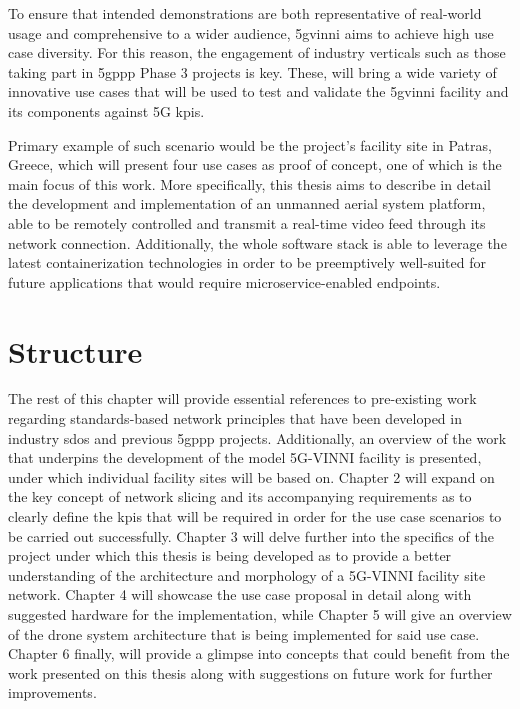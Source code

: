 To ensure that intended demonstrations are both representative of real-world usage and comprehensive to a wider audience, \acrshort{5gvinni} aims to achieve high use case diversity. For this reason, the engagement of industry verticals such as those taking part in \acrshort{5gppp} Phase 3 projects is key. These,  will bring a wide variety of innovative use cases that will be used to test and validate the \acrshort{5gvinni} facility and its components against 5G \acrshort{kpi}s. 

Primary example of such scenario would be the project's facility site in Patras, Greece, which will present four use cases as proof of concept, one of which is the main focus of this work. More specifically, this thesis aims to describe in detail the development and implementation of an unmanned aerial system platform, able to be remotely controlled and transmit a real-time video feed through its network connection. Additionally, the whole software stack is able to leverage the latest containerization technologies in order to be preemptively well-suited for future applications that would require microservice-enabled endpoints.

\section{Structure}
The rest of this chapter will provide essential references to pre-existing work regarding standards-based network principles that have been developed in industry \acrfull{sdo}s and previous \acrshort{5gppp} projects. Additionally, an overview of the work that underpins the development of the model 5G-VINNI facility is presented, under which individual facility sites will be based on.
Chapter 2 will expand on the key concept of network slicing and its accompanying requirements as to clearly define the \acrshort{kpi}s that will be required in order for the use case scenarios to be carried out successfully.
Chapter 3 will delve further into the specifics of the project under which this thesis is being developed as to provide a better understanding of the architecture and morphology of a 5G-VINNI facility site network.
Chapter 4 will showcase the use case proposal in detail along with suggested hardware for the implementation, while Chapter 5 will give an overview of the drone system architecture that is being implemented for said use case.
Chapter 6 finally, will provide a glimpse into concepts that could benefit from the work presented on this thesis along with suggestions on future work for further improvements.

